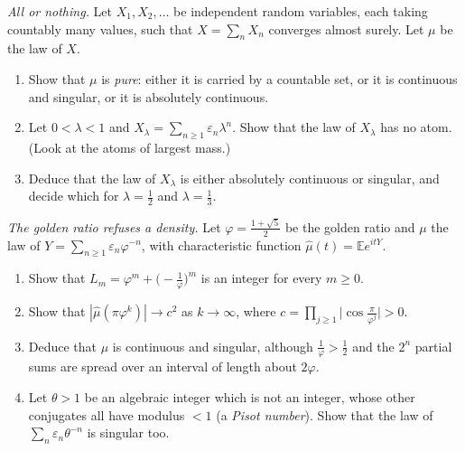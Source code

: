 \begin{exercise}[$\star\star$]\label{pb:purity}
\emph{All or nothing.} Let $X_1,X_2,\dots$ be independent random variables, each taking countably many values, such that $X=\sum_nX_n$ converges almost surely.
Let $\mu$ be the law of $X$.
\begin{enumerate}[label=(\alph*)]
\item Show that $\mu$ is \emph{pure}: either it is carried by a countable set, or it is continuous and singular, or it is absolutely continuous.
\item Let $0<\lambda<1$ and $X_\lambda=\sum_{n\ge1}\varepsilon_n\lambda^n$. Show that the law of $X_\lambda$ has no atom. (Look at the atoms of largest mass.)
\item Deduce that the law of $X_\lambda$ is either absolutely continuous or singular, and decide which for $\lambda=\frac12$ and $\lambda=\frac13$.
\end{enumerate}
\end{exercise}

\begin{exercise}[$\star\star\star$]\label{pb:golden}
\emph{The golden ratio refuses a density.} Let $\varphi=\frac{1+\sqrt5}2$ be the golden ratio and $\mu$ the law of $Y=\sum_{n\ge1}\varepsilon_n\varphi^{-n}$, with
characteristic function $\hat\mu(t)=\mathbb Ee^{itY}$.
\begin{enumerate}[label=(\alph*)]
\item Show that $L_m=\varphi^m+\bigl(-\frac1\varphi\bigr)^m$ is an integer for every $m\ge0$.
\item Show that $|\hat\mu(\pi\varphi^k)|\to c^2$ as $k\to\infty$, where $c=\prod_{j\ge1}\bigl|\cos\frac\pi{\varphi^j}\bigr|>0$.
\item Deduce that $\mu$ is continuous and singular, although $\frac1\varphi>\frac12$ and the $2^n$ partial sums are spread over an interval of length about $2\varphi$.
\item Let $\theta>1$ be an algebraic integer which is not an integer, whose other conjugates all have modulus $<1$ (a \emph{Pisot number}). Show that the law of
$\sum_n\varepsilon_n\theta^{-n}$ is singular too.
\end{enumerate}
\end{exercise}

